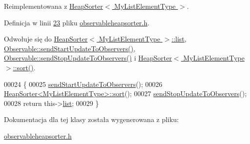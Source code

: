 Reimplementowana z \hyperlink{class_heap_sorter_a31220ba55d4478c50578c3a94dcbf26c}{Heap\-Sorter$<$ My\-List\-Element\-Type $>$}.



Definicja w linii \hyperlink{observableheapsorter_8h_source_l00023}{23} pliku \hyperlink{observableheapsorter_8h_source}{observableheapsorter.\-h}.



Odwołuje się do \hyperlink{heapsorter_8h_source_l00019}{Heap\-Sorter$<$ My\-List\-Element\-Type $>$\-::list}, \hyperlink{observable_8h_source_l00023}{Observable\-::send\-Start\-Update\-To\-Observers()}, \hyperlink{observable_8h_source_l00030}{Observable\-::send\-Stop\-Update\-To\-Observers()} i \hyperlink{heapsorter_8h_source_l00035}{Heap\-Sorter$<$ My\-List\-Element\-Type $>$\-::sort()}.


\begin{DoxyCode}
00024         \{
00025                 \hyperlink{class_observable_a78df64057f152342a43f27979186a6ba}{sendStartUpdateToObservers}();
00026                 \hyperlink{class_heap_sorter_a31220ba55d4478c50578c3a94dcbf26c}{HeapSorter<MyListElementType>::sort}();
00027                 \hyperlink{class_observable_a16f75ed1514a0cb7526b5a5d2b7ca7c6}{sendStopUpdateToObservers}();
00028                 \textcolor{keywordflow}{return} this->\hyperlink{class_heap_sorter_a6b8ac615ff2de0c2e510ad215d0508d9}{list};
00029         \}
\end{DoxyCode}


Dokumentacja dla tej klasy została wygenerowana z pliku\-:\begin{DoxyCompactItemize}
\item 
\hyperlink{observableheapsorter_8h}{observableheapsorter.\-h}\end{DoxyCompactItemize}

